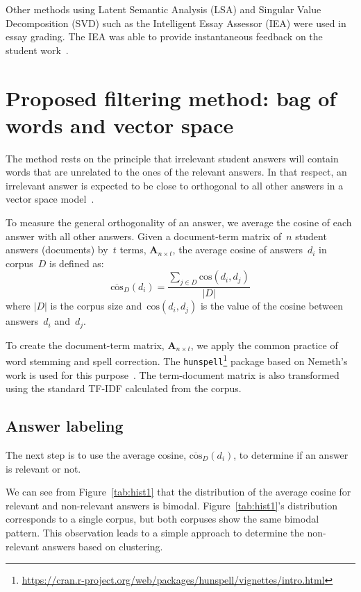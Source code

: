 \documentclass{edm_template}
\begin{document}
Other methods using Latent Semantic Analysis (LSA) and Singular Value Decomposition (SVD) such as the Intelligent Essay Assessor (IEA) \cite{hearst2000debate,Jerrams-Smith+Soh+Callear+2001} were used in essay grading. The IEA was able to provide instantaneous feedback on the student work~\cite{galhardi2018machine}.
\section{Proposed filtering method: bag of words and vector space}

The method rests on the principle that irrelevant student answers will contain words that are unrelated to the ones of the relevant answers.  In that respect, an irrelevant answer is expected to be close to orthogonal to all other answers in a vector space model~\cite{turney2010frequency}.

To measure the general orthogonality of an answer, we average the cosine of each answer with all other answers.  Given a document-term matrix of~$n$ student answers (documents) by~$t$ terms, $\mathbf{A}_{n \times t}$, the average cosine of answers~$d_i$ in corpus~$D$ is defined as:
\[ \overline{\textrm{cos}}_D(d_i) = \frac{\sum_{j \in D} \textrm{cos}(d_i, d_j)}{|D|} \]
where $|D|$ is the corpus size and~$\textrm{cos}(d_i, d_j)$ is the value of the cosine between answers~$d_i$ and~$d_j$.

To create the document-term matrix, $\mathbf{A}_{n \times t}$, we apply the common practice of word stemming and spell correction.  The \texttt{hunspell}\footnote{\url{https://cran.r-project.org/web/packages/hunspell/vignettes/intro.html}} package based on Nemeth's work is used for this purpose~\cite{nemeth2011hunspello}. The term-document matrix is also transformed using the standard TF-IDF calculated from the corpus.  


\subsection{Answer labeling}

The next step is to use the average cosine, $\overline{\textrm{cos}}_D(d_i)$, to determine if an answer is relevant or not.

We can see from Figure~\ref{tab:hist1} that the distribution of the average cosine for relevant and non-relevant answers is bimodal. Figure~\ref{tab:hist1}'s distribution corresponds to a single corpus, but both corpuses show the same bimodal pattern.  This observation leads to a simple approach to determine the non-relevant answers based on clustering.  
\end{document}
